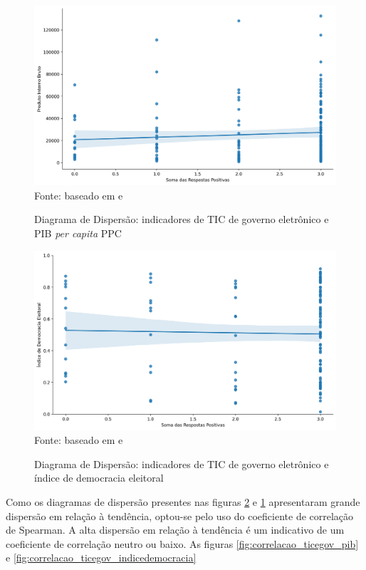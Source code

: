 \begin{figure}[H]
	\centering
	\caption{Diagrama de Dispersão: indicadores de TIC de governo eletrônico e PIB \textit{per capita} PPC}
	\includegraphics[width=1\linewidth]{figuras/ict_in_government/dispersao_ticegov_pib}
	\label{fig:dispersao_ticegov_pib}
	\footnotesize{Fonte: baseado em \cite{WB_pib_per_capita_países} e \cite{ONU_ICT_in_government_indicators}}
\end{figure}

\begin{figure}[H]
	\centering
	\caption{Diagrama de Dispersão: indicadores de TIC de governo eletrônico e índice de democracia eleitoral}
	\includegraphics[width=1\linewidth]{figuras/ict_in_government/dispersao_ticegov_indicedemocracia}
	\label{fig:dispersao_ticegov_indicedemocracia}
	\footnotesize{Fonte: baseado em \cite{electoral_democracy_index} e \cite{ONU_ICT_in_government_indicators}}
\end{figure}

Como os diagramas de dispersão presentes nas figuras \ref{fig:dispersao_ticegov_indicedemocracia} e \ref{fig:dispersao_ticegov_pib} apresentaram grande dispersão em relação à tendência, optou-se pelo uso do coeficiente de correlação de Spearman. A alta dispersão em relação à tendência é um indicativo de um coeficiente de correlação neutro ou baixo. As figuras \ref{fig:correlacao_ticegov_pib} e \ref{fig:correlacao_ticegov_indicedemocracia}

